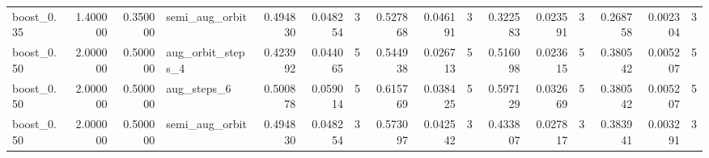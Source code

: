 \begin{tabular}{lrrlrrrrrrrrrrrr}
boost_0.35 & 1.400000 & 0.350000 & semi_aug_orbit & 0.494830 & 0.048254 & 3 & 0.527868 & 0.046191 & 3 & 0.322583 & 0.023591 & 3 & 0.268758 & 0.002304 & 3 \\
boost_0.50 & 2.000000 & 0.500000 & aug_orbit_steps_4 & 0.423992 & 0.044065 & 5 & 0.544938 & 0.026713 & 5 & 0.516098 & 0.023615 & 5 & 0.380542 & 0.005207 & 5 \\
boost_0.50 & 2.000000 & 0.500000 & aug_steps_6 & 0.500878 & 0.059014 & 5 & 0.615769 & 0.038425 & 5 & 0.597129 & 0.032669 & 5 & 0.380542 & 0.005207 & 5 \\
boost_0.50 & 2.000000 & 0.500000 & semi_aug_orbit & 0.494830 & 0.048254 & 3 & 0.573097 & 0.042542 & 3 & 0.433807 & 0.027817 & 3 & 0.383941 & 0.003291 & 3 \\
\bottomrule
\end{tabular}
